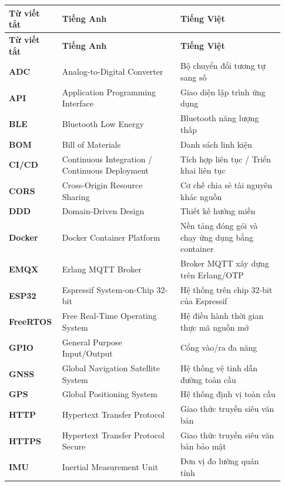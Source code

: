 \documentclass[a4paper]{extarticle}
\newcounter{none} %
\begin{document}
{\def\LTcaptype{none} %
\setlength{\tabcolsep}{4pt}
\begin{longtable}{|L{0.160\linewidth}|L{0.410\linewidth}|L{0.360\linewidth}|}
\hline
\textbf{Từ viết tắt} & \textbf{Tiếng Anh} & \textbf{Tiếng Việt} \\
\hline
\endfirsthead
\hline
\textbf{Từ viết tắt} & \textbf{Tiếng Anh} & \textbf{Tiếng Việt} \\
\hline
\endhead
\endfoot
\endlastfoot
\textbf{ADC} & Analog-to-Digital Converter & Bộ chuyển đổi tương tự sang số \\\hline
\textbf{API} & Application Programming Interface & Giao diện lập trình ứng dụng \\\hline
\textbf{BLE} & Bluetooth Low Energy & Bluetooth năng lượng thấp \\\hline
\textbf{BOM} & Bill of Materials & Danh sách linh kiện \\\hline
\textbf{CI/CD} & Continuous Integration / Continuous Deployment & Tích hợp liên tục / Triển khai liên tục \\\hline
\textbf{CORS} & Cross-Origin Resource Sharing & Cơ chế chia sẻ tài nguyên khác nguồn \\\hline
\textbf{DDD} & Domain-Driven Design & Thiết kế hướng miền \\\hline
\textbf{Docker} & Docker Container Platform & Nền tảng đóng gói và chạy ứng dụng bằng container \\\hline
\textbf{EMQX} & Erlang MQTT Broker & Broker MQTT xây dựng trên Erlang/OTP \\\hline
\textbf{ESP32} & Espressif System-on-Chip 32-bit & Hệ thống trên chip 32-bit của Espressif \\\hline
\textbf{FreeRTOS} & Free Real-Time Operating System & Hệ điều hành thời gian thực mã nguồn mở \\\hline
\textbf{GPIO} & General Purpose Input/Output & Cổng vào/ra đa năng \\\hline
\textbf{GNSS} & Global Navigation Satellite System & Hệ thống vệ tinh dẫn đường toàn cầu \\\hline
\textbf{GPS} & Global Positioning System & Hệ thống định vị toàn cầu \\\hline
\textbf{HTTP} & Hypertext Transfer Protocol & Giao thức truyền siêu văn bản \\\hline
\textbf{HTTPS} & Hypertext Transfer Protocol Secure & Giao thức truyền siêu văn bản bảo mật \\\hline
\textbf{IMU} & Inertial Measurement Unit & Đơn vị đo lường quán tính \\\hline

\end{longtable}}
\end{document}
